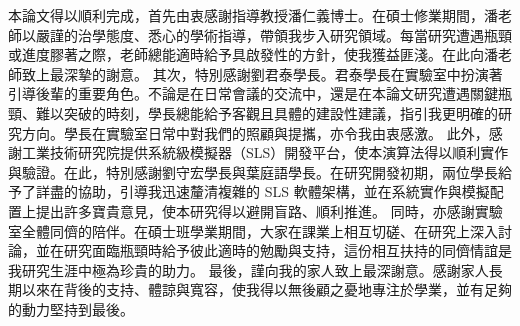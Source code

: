 
\begin{acknowledgement}
本論文得以順利完成，首先由衷感謝指導教授潘仁義博士。在碩士修業期間，潘老師以嚴謹的治學態度、悉心的學術指導，帶領我步入研究領域。每當研究遭遇瓶頸或進度膠著之際，老師總能適時給予具啟發性的方針，使我獲益匪淺。在此向潘老師致上最深摯的謝意。
其次，特別感謝劉君泰學長。君泰學長在實驗室中扮演著引導後輩的重要角色。不論是在日常會議的交流中，還是在本論文研究遭遇關鍵瓶頸、難以突破的時刻，學長總能給予客觀且具體的建設性建議，指引我更明確的研究方向。學長在實驗室日常中對我們的照顧與提攜，亦令我由衷感激。
此外，感謝工業技術研究院提供系統級模擬器（SLS）開發平台，使本演算法得以順利實作與驗證。在此，特別感謝劉守宏學長與葉庭語學長。在研究開發初期，兩位學長給予了詳盡的協助，引導我迅速釐清複雜的 SLS 軟體架構，並在系統實作與模擬配置上提出許多寶貴意見，使本研究得以避開盲路、順利推進。
同時，亦感謝實驗室全體同儕的陪伴。在碩士班學業期間，大家在課業上相互切磋、在研究上深入討論，並在研究面臨瓶頸時給予彼此適時的勉勵與支持，這份相互扶持的同儕情誼是我研究生涯中極為珍貴的助力。
最後，謹向我的家人致上最深謝意。感謝家人長期以來在背後的支持、體諒與寬容，使我得以無後顧之憂地專注於學業，並有足夠的動力堅持到最後。


\end{acknowledgement}